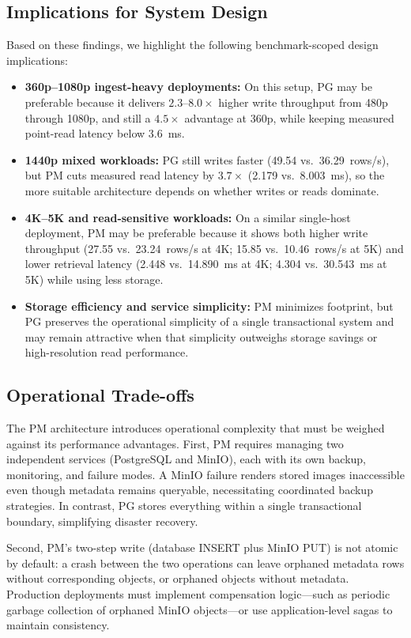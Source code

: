 \documentclass[conference]{IEEEtran}
\begin{document}
\subsection{Implications for System Design}
Based on these findings, we highlight the following benchmark-scoped design implications:
\begin{itemize}
    \item \textbf{360p--1080p ingest-heavy deployments:} On this setup, PG may be preferable because it delivers $2.3$--$8.0\times$ higher write throughput from 480p through 1080p, and still a $4.5\times$ advantage at 360p, while keeping measured point-read latency below 3.6~ms.
    \item \textbf{1440p mixed workloads:} PG still writes faster (49.54 vs.\ 36.29~rows/s), but PM cuts measured read latency by $3.7\times$ (2.179 vs.\ 8.003~ms), so the more suitable architecture depends on whether writes or reads dominate.
    \item \textbf{4K--5K and read-sensitive workloads:} On a similar single-host deployment, PM may be preferable because it shows both higher write throughput (27.55 vs.\ 23.24~rows/s at 4K; 15.85 vs.\ 10.46~rows/s at 5K) and lower retrieval latency (2.448 vs.\ 14.890~ms at 4K; 4.304 vs.\ 30.543~ms at 5K) while using less storage.
    \item \textbf{Storage efficiency and service simplicity:} PM minimizes footprint, but PG preserves the operational simplicity of a single transactional system and may remain attractive when that simplicity outweighs storage savings or high-resolution read performance.
\end{itemize}

\subsection{Operational Trade-offs}
The PM architecture introduces operational complexity that must be weighed against its performance advantages. First, PM requires managing two independent services (PostgreSQL and MinIO), each with its own backup, monitoring, and failure modes. A MinIO failure renders stored images inaccessible even though metadata remains queryable, necessitating coordinated backup strategies. In contrast, PG stores everything within a single transactional boundary, simplifying disaster recovery.

Second, PM's two-step write (database INSERT plus MinIO PUT) is not atomic by default: a crash between the two operations can leave orphaned metadata rows without corresponding objects, or orphaned objects without metadata. Production deployments must implement compensation logic---such as periodic garbage collection of orphaned MinIO objects---or use application-level sagas to maintain consistency.
\end{document}
